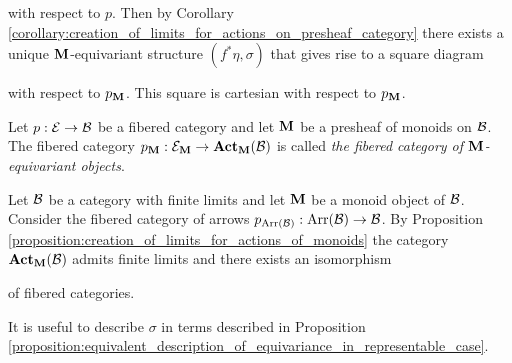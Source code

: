 with respect to $p$. Then by Corollary \ref{corollary:creation_of_limits_for_actions_on_presheaf_category} there exists a unique $\mathbf{M}$-equivariant structure $(f^*\eta,\sigma)$ that gives rise to a square diagram
\begin{center}
\end{center}
with respect to $p_{\mathbf{M}}$. This square is cartesian with respect to $p_{\mathbf{M}}$.

\begin{definition}
Let $p:{\mathcal E} \rightarrow {\mathcal B}$ be a fibered category and let $\mathbf{M}$ be a presheaf of monoids on ${\mathcal B}$. The fibered category $p_{\mathbf{M}}:{\mathcal E}_{\mathbf{M}}\rightarrow \mathbf{Act}_{\mathbf{M}}({\mathcal B})$ is called \textit{the fibered category of $\mathbf{M}$-equivariant objects}.
\end{definition}

\begin{example}\label{example:the_fibered_category_of_equivariant_objects_with_respect_to_a_monoid_in_category_of_arrows}
Let ${\mathcal B}$ be a category with finite limits and let $\mathbf{M}$ be a monoid object of ${\mathcal B}$. Consider the fibered category of arrows $p_{\mathrm{Arr}({\mathcal B})}:\mathrm{Arr}({\mathcal B})\rightarrow {\mathcal B}$. By Proposition \ref{proposition:creation_of_limits_for_actions_of_monoids} the category $\mathbf{Act}_{\mathbf{M}}({\mathcal B})$ admits finite limits and there exists an isomorphism
\begin{center}
\end{center}
of fibered categories.
\end{example}
\noindent
It is useful to describe $\sigma$ in terms described in Proposition \ref{proposition:equivalent_description_of_equivariance_in_representable_case}.

